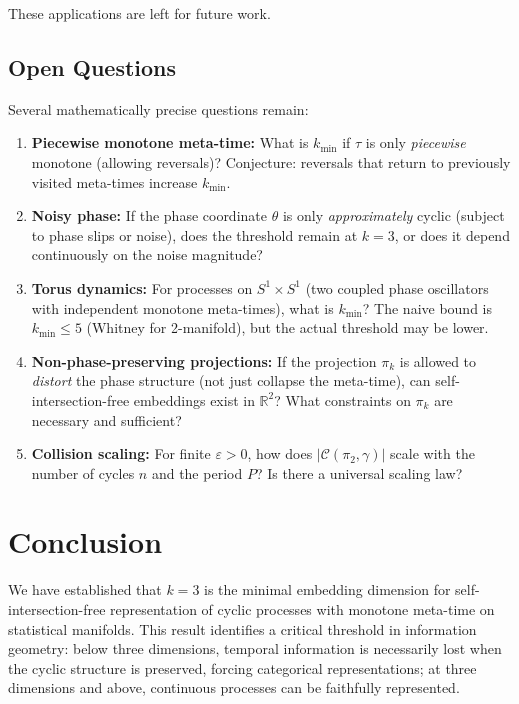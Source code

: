 \documentclass[12pt]{article}
\newcommand{\R}{\mathbb{R}}
\begin{document}
These applications are left for future work.

\subsection{Open Questions}

Several mathematically precise questions remain:

\begin{enumerate}
    \item \textbf{Piecewise monotone meta-time:} What is $k_{\min}$ if $\tau$ is only \emph{piecewise} monotone (allowing reversals)? Conjecture: reversals that return to previously visited meta-times increase $k_{\min}$.

    \item \textbf{Noisy phase:} If the phase coordinate $\theta$ is only \emph{approximately} cyclic (subject to phase slips or noise), does the threshold remain at $k = 3$, or does it depend continuously on the noise magnitude?

    \item \textbf{Torus dynamics:} For processes on $S^1 \times S^1$ (two coupled phase oscillators with independent monotone meta-times), what is $k_{\min}$? The naive bound is $k_{\min} \leq 5$ (Whitney for 2-manifold), but the actual threshold may be lower.

    \item \textbf{Non-phase-preserving projections:} If the projection $\pi_k$ is allowed to \emph{distort} the phase structure (not just collapse the meta-time), can self-intersection-free embeddings exist in $\R^2$? What constraints on $\pi_k$ are necessary and sufficient?

    \item \textbf{Collision scaling:} For finite $\varepsilon > 0$, how does $|\mathcal{C}(\pi_2, \gamma)|$ scale with the number of cycles $n$ and the period $P$? Is there a universal scaling law?
\end{enumerate}

\section{Conclusion}

We have established that $k = 3$ is the minimal embedding dimension for self-intersection-free representation of cyclic processes with monotone meta-time on statistical manifolds. This result identifies a critical threshold in information geometry: below three dimensions, temporal information is necessarily lost when the cyclic structure is preserved, forcing categorical representations; at three dimensions and above, continuous processes can be faithfully represented.
\end{document}
